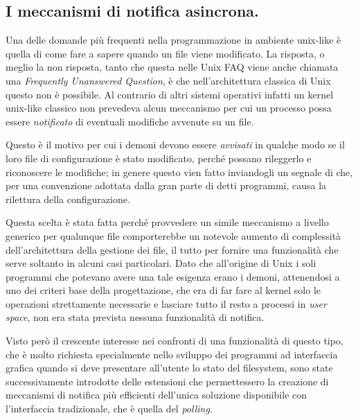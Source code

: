 



\subsection{I meccanismi di notifica asincrona.}
\label{sec:file_asyncronous_lease}

Una delle domande più frequenti nella programmazione in ambiente unix-like è
quella di come fare a sapere quando un file viene modificato. La risposta, o
meglio la non risposta, tanto che questa nelle Unix FAQ \cite{UnixFAQ} viene
anche chiamata una \textit{Frequently Unanswered Question}, è che
nell'architettura classica di Unix questo non è possibile. Al contrario di
altri sistemi operativi infatti un kernel unix-like classico non prevedeva
alcun meccanismo per cui un processo possa essere \textsl{notificato} di
eventuali modifiche avvenute su un file. 

Questo è il motivo per cui i demoni devono essere \textsl{avvisati} in qualche
modo se il loro file di configurazione è stato modificato, perché possano
rileggerlo e riconoscere le modifiche; in genere questo vien fatto inviandogli
un segnale di  che, per una convenzione adottata dalla gran
parte di detti programmi, causa la rilettura della configurazione.

Questa scelta è stata fatta perché provvedere un simile meccanismo a livello
generico per qualunque file comporterebbe un notevole aumento di complessità
dell'architettura della gestione dei file, il tutto per fornire una
funzionalità che serve soltanto in alcuni casi particolari. Dato che
all'origine di Unix i soli programmi che potevano avere una tale esigenza
erano i demoni, attenendosi a uno dei criteri base della progettazione, che
era di far fare al kernel solo le operazioni strettamente necessarie e
lasciare tutto il resto a processi in \textit{user space}, non era stata
prevista nessuna funzionalità di notifica.

Visto però il crescente interesse nei confronti di una funzionalità di questo
tipo, che è molto richiesta specialmente nello sviluppo dei programmi ad
interfaccia grafica quando si deve presentare all'utente lo stato del
filesystem, sono state successivamente introdotte delle estensioni che
permettessero la creazione di meccanismi di notifica più efficienti dell'unica
soluzione disponibile con l'interfaccia tradizionale, che è quella del
\textit{polling}.

